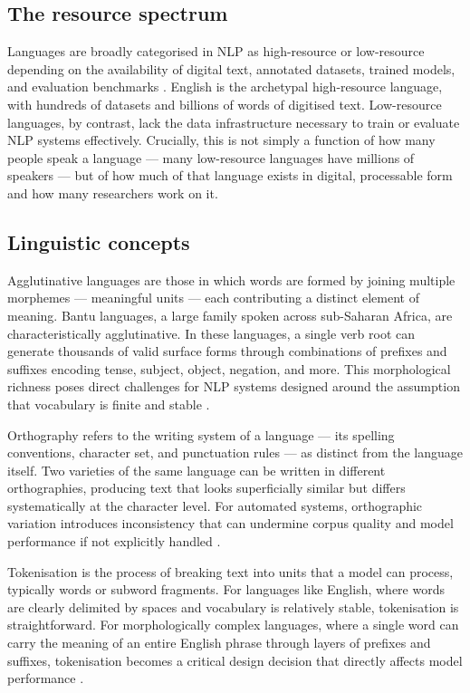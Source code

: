 \documentclass[12pt]{ThesisRU}
\begin{document}
\subsection{The resource spectrum}
Languages are broadly categorised in NLP as high-resource or low-resource depending on the availability of digital text, annotated datasets, trained models, and evaluation benchmarks \citep{shahid2025think}. English is the archetypal high-resource language, with hundreds of datasets and billions of words of digitised text. Low-resource languages, by contrast, lack the data infrastructure necessary to train or evaluate NLP systems effectively. Crucially, this is not simply a function of how many people speak a language — many low-resource languages have millions of speakers — but of how much of that language exists in digital, processable form and how many researchers work on it.

\subsection{Linguistic concepts}
Agglutinative languages are those in which words are formed by joining multiple morphemes — meaningful units — each contributing a distinct element of meaning. Bantu languages, a large family spoken across sub-Saharan Africa, are characteristically agglutinative. In these languages, a single verb root can generate thousands of valid surface forms through combinations of prefixes and suffixes encoding tense, subject, object, negation, and more. This morphological richness poses direct challenges for NLP systems designed around the assumption that vocabulary is finite and stable \citep{kambarami2021computational}.

Orthography refers to the writing system of a language — its spelling conventions, character set, and punctuation rules — as distinct from the language itself. Two varieties of the same language can be written in different orthographies, producing text that looks superficially similar but differs systematically at the character level. For automated systems, orthographic variation introduces inconsistency that can undermine corpus quality and model performance if not explicitly handled \citep{makutoane2022people}.

Tokenisation is the process of breaking text into units that a model can process, typically words or subword fragments. For languages like English, where words are clearly delimited by spaces and vocabulary is relatively stable, tokenisation is straightforward. For morphologically complex languages, where a single word can carry the meaning of an entire English phrase through layers of prefixes and suffixes, tokenisation becomes a critical design decision that directly affects model performance \citep{kambarami2021computational}.
\end{document}
